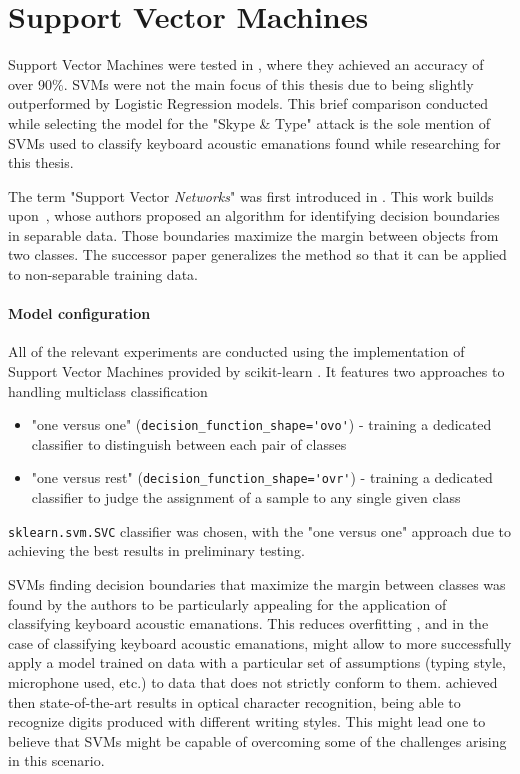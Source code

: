 \documentclass[../main.tex]{subfiles}
\begin{document}
\section{Support Vector Machines} 
\label{sec:models_support_vector_machines}
Support Vector Machines were tested in \cite{skype2017}, where they achieved an accuracy of over 90\%. SVMs were not the main focus of this thesis due to being slightly outperformed by Logistic Regression models. This brief comparison conducted while selecting the model for the "Skype \& Type" attack is the sole mention of SVMs used to classify keyboard acoustic emanations found while researching for this thesis.

The term "Support Vector \textit{Networks}" was first introduced in \cite{cortesvapnik1995svm}. This work builds upon~\cite{vapnik1992protosvm}, whose authors proposed an algorithm for identifying decision boundaries in separable data. Those boundaries maximize the margin between objects from two classes. The successor paper \cite{cortesvapnik1995svm} generalizes the method so that it can be applied to non-separable training data.


\paragraph{Model configuration}

All of the relevant experiments are conducted using the implementation of Support Vector Machines provided by
scikit-learn \cite{scikit-learn}. It features two approaches to handling multiclass classification
\begin{itemize}
    \item "one versus one" (\verb|decision_function_shape='ovo'|) - training a dedicated classifier to
    distinguish between each pair of classes
    \item "one versus rest" (\verb|decision_function_shape='ovr'|) - training a dedicated classifier to judge the assignment
    of a sample to any single given class
\end{itemize}
\verb|sklearn.svm.SVC| classifier was chosen, with the "one versus one" approach
due to achieving the best results in preliminary testing.

SVMs finding decision boundaries that maximize the margin between classes was found by the authors to be particularly 
appealing for the application of classifying keyboard acoustic emanations.
This reduces overfitting \cite{cortesvapnik1995svm}, and in the case of classifying keyboard acoustic emanations, might allow to more successfully apply a model
trained on data with a particular set of assumptions (typing style, microphone used, etc.)
to data that does not strictly conform to them.
\cite{cortesvapnik1995svm} achieved then state-of-the-art results in optical character recognition, being able to
recognize digits produced with different writing styles. This might lead one to believe that SVMs might be capable
of overcoming some of the challenges arising in this scenario.
\end{document}
